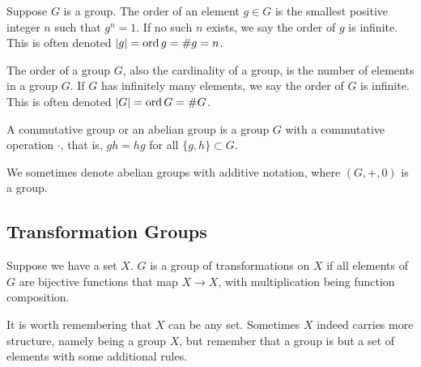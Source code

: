 \begin{definition}
    Suppose \(G\) is a group.
    The order of an element \(g \in G\)
    is the smallest positive integer \(n\)
    such that \(g^n = 1\).
    If no such \(n\) exists,
    we say the order of \(g\) is infinite.
    This is often denoted \(\abs{g} = \operatorname{ord}{g} = \#g = n\).
\end{definition}
\begin{definition}
    The order of a group \(G\),
    also the cardinality of a group,
    is the number of elements in a group \(G\).
    If \(G\) has infinitely many elements,
    we say the order of \(G\) is infinite.
    This is often denoted \(\abs{G} = \operatorname{ord}{G} = \#G\).
\end{definition}

\begin{definition}
    A commutative group or an abelian group
    is a group \(G\) with a commutative operation \(\cdot\),
    that is, \(gh = hg\) for all \(\{g,h\} \subset G\).
\end{definition}
\begin{remark}
    We sometimes denote abelian groups with additive notation,
    where \((G,+,0)\) is a group.
\end{remark}


\subsection{Transformation Groups}

\begin{definition}
    Suppose we have a set \(X\).
    \(G\) is a group of transformations on \(X\)
    if all elements of \(G\) are bijective functions that map \(X \to X\),
    with multiplication being function composition.
\end{definition}
\begin{remark}
    It is worth remembering that \(X\) can be any set.
    Sometimes \(X\) indeed carries more structure,
    namely being a group \(X\),
    but remember that a group is but a set of elements
    with some additional rules.
\end{remark}

